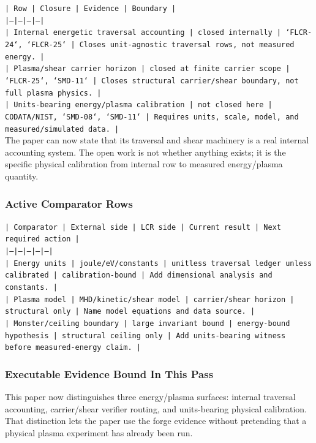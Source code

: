 \documentclass[11pt]{article}
\begin{document}
\noindent\texttt{| Row | Closure | Evidence | Boundary |}\\
\noindent\texttt{|---|---|---|---|}\\
\noindent\texttt{| Internal energetic traversal accounting | closed internally | `FLCR-24`, `FLCR-25` | Closes unit-agnostic traversal rows, not measured energy. |}\\
\noindent\texttt{| Plasma/shear carrier horizon | closed at finite carrier scope | `FLCR-25`, `SMD-11` | Closes structural carrier/shear boundary, not full plasma physics. |}\\
\noindent\texttt{| Units-bearing energy/plasma calibration | not closed here | CODATA/NIST, `SMD-08`, `SMD-11` | Requires units, scale, model, and measured/simulated data. |}\\

The paper can now state that its traversal and shear machinery is a real internal accounting system. The open work is not whether anything exists; it is the specific physical calibration from internal row to measured energy/plasma quantity.

\subsubsection*{Active Comparator Rows}

\noindent\texttt{| Comparator | External side | LCR side | Current result | Next required action |}\\
\noindent\texttt{|---|---|---|---|---|}\\
\noindent\texttt{| Energy units | joule/eV/constants | unitless traversal ledger unless calibrated | calibration-bound | Add dimensional analysis and constants. |}\\
\noindent\texttt{| Plasma model | MHD/kinetic/shear model | carrier/shear horizon | structural only | Name model equations and data source. |}\\
\noindent\texttt{| Monster/ceiling boundary | large invariant bound | energy-bound hypothesis | structural ceiling only | Add units-bearing witness before measured-energy claim. |}\\

\subsubsection*{Executable Evidence Bound In This Pass}

This paper now distinguishes three energy/plasma surfaces: internal traversal accounting, carrier/shear verifier routing, and units-bearing physical calibration. That distinction lets the paper use the forge evidence without pretending that a physical plasma experiment has already been run.
\end{document}
